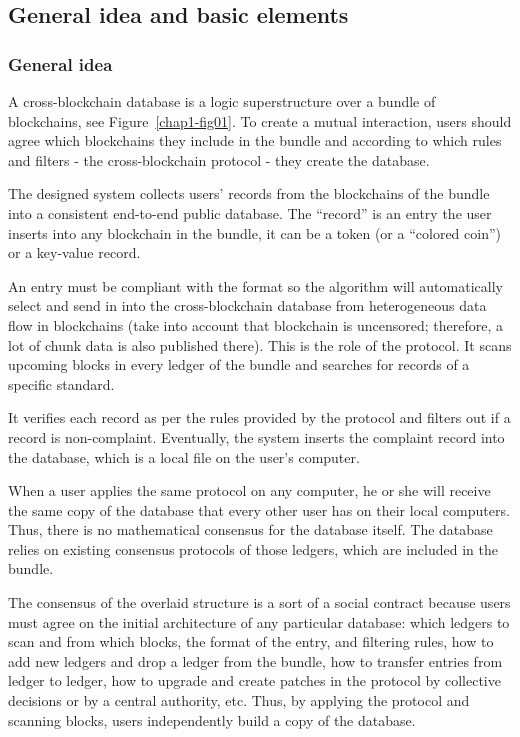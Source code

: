 \begin{multicols}{2}
\subsection{General idea and basic elements}\label{subsec-4.1}

\vspace{.1cm}

\subsubsection{General idea}\label{subsubsec-4.1.a}

A cross-blockchain database is a logic superstructure over a bundle of blockchains, see Figure~\ref{chap1-fig01}. To create a mutual interaction, users should agree which blockchains they include in the bundle and according to which rules and filters - the cross-blockchain protocol - they create the database.

The designed system collects users’ records from the blockchains of the bundle into a consistent end-to-end public database. The “record” is an entry the user inserts into any blockchain in the bundle, it can be a token (or a “colored coin”) or a key-value record.

An entry must be compliant with the format so the algorithm will automatically select and send in into the cross-blockchain database from heterogeneous data flow in blockchains (take into account that blockchain is uncensored; therefore, a lot of chunk data is also published there). This is the role of the protocol. It scans upcoming blocks in every ledger of the bundle and searches for records of a specific standard. 

It verifies each record as per the rules provided by the protocol and filters out if a record is non-complaint. Eventually, the system inserts the complaint record into the database, which is a local file on the user’s computer.

When a user applies the same protocol on any computer, he or she will receive the same copy of the database that every other user has on their local computers. Thus, there is no mathematical consensus for the database itself. The database relies on existing consensus protocols of those ledgers, which are included in the bundle. 

The consensus of the overlaid structure is a sort of a social contract because users must agree on the initial architecture of any particular database: which ledgers to scan and from which blocks, the format of the entry, and filtering rules, how to add new ledgers and drop a ledger from the bundle, how to transfer entries from ledger to ledger, how to upgrade and create patches in the protocol by collective decisions or by a central authority, etc. Thus, by applying the protocol and scanning blocks, users independently build a copy of the database.


\end{multicols}
